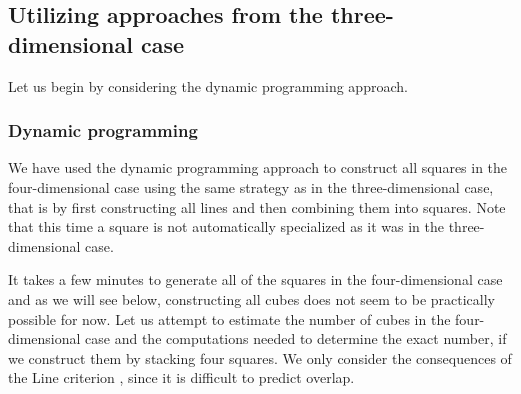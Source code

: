 \subsection{Utilizing approaches from the three-dimensional case}
\noindent Let us begin by considering the dynamic programming approach.

\subsubsection{Dynamic programming}
We have used the dynamic programming approach to construct all squares in the four-dimensional case using the same strategy as in the three-dimensional case, that is by first constructing all lines and then combining them into squares. Note that this time a square is not automatically specialized as it was in the three-dimensional case.


\noindent It takes a few minutes to generate all of the squares in the four-dimensional case and as we will see below, constructing all cubes does not seem to be practically possible for now. Let us attempt to estimate the number of cubes in the four-dimensional case and the computations needed to determine the exact number, if we construct them by stacking four squares. We only consider the consequences of the Line criterion , since it is difficult to predict overlap.

